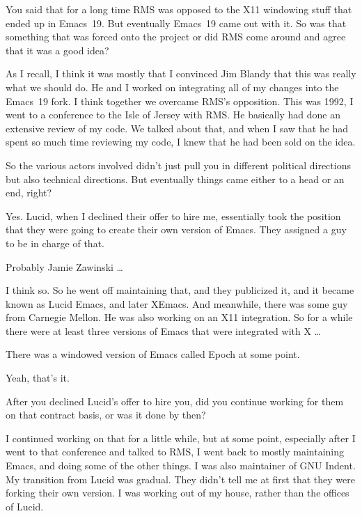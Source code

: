 \documentclass[format=acmsmall,screen]{acmart}
\begin{document}
\begin{question}
You said that for a long time RMS was opposed to the X11 windowing
stuff that ended up in Emacs~19.  But eventually Emacs~19 came out
with it.  So was that something that was forced onto the project or
did RMS come around and agree that it was a good idea?
\end{question}
%
As I recall, I think it was mostly that I convinced Jim Blandy that
this was really what we should do.  He and I worked on integrating all
of my changes into the Emacs~19 fork.  I think together we overcame
RMS's opposition.  This was 1992, I went to a conference to the Isle
of Jersey with RMS.  He basically had done an extensive review of my
code.  We talked about that, and when I saw that he had spent so much
time reviewing my code, I knew that he had been sold on the idea.

\begin{question}
So the various actors involved didn't just pull you in different
political directions but also technical directions.  But eventually
things came either to a head or an end, right?
\end{question}
%
Yes.  Lucid, when I declined their offer to hire me, essentially
took the position that they were going to create their own version of
Emacs.  They assigned a guy to be in charge of that.

\begin{question}
Probably Jamie Zawinski \ldots{}
\end{question}
%
I think so.  So he went off maintaining that, and they publicized
it, and it became known as Lucid Emacs, and later XEmacs.  And
meanwhile, there was some guy from Carnegie Mellon.  He was also
working on an X11 integration.  So for a while there were at least
three versions of Emacs that were integrated with X \ldots{}

\begin{question}
There was a windowed version of Emacs called Epoch at some point.
\end{question}
%
Yeah, that's it.

\begin{question}
After you declined Lucid's offer to hire you, did you continue
working for them on that contract basis, or was it done by then?
\end{question}
%
I continued working on that for a little while, but at some point,
especially after I went to that conference and talked to RMS, I went
back to mostly maintaining Emacs, and doing some of the other things.
I was also maintainer of GNU Indent.  My transition from Lucid was
gradual.  They didn't tell me at first that they were forking their
own version.  I was working out of my house, rather than the offices
of Lucid.
\end{document}
